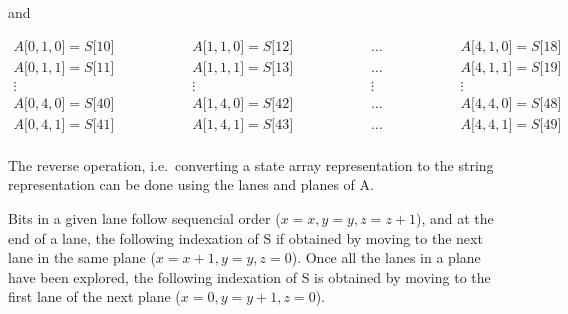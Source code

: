 and

\begin{equation}
\begin{aligned}
A \lbrack 0,1,0\rbrack = S\lbrack 10 \rbrack & \hspace{2cm} A \lbrack 1,1,0\rbrack = S\lbrack 12 \rbrack & \hspace{2cm} \ldots & \hspace{2cm} A \lbrack 4,1,0\rbrack = S\lbrack 18 \rbrack\\
A \lbrack 0,1,1\rbrack = S\lbrack 11 \rbrack & \hspace{2cm} A \lbrack 1,1,1\rbrack = S\lbrack 13 \rbrack & \hspace{2cm} \ldots & \hspace{2cm} A \lbrack 4,1,1\rbrack = S\lbrack 19 \rbrack\\
\vdots                                       & \hspace{2cm} \vdots                                       & \hspace{2cm} \vdots & \hspace{2cm} \vdots                                    \\
A \lbrack 0,4,0\rbrack = S\lbrack 40 \rbrack & \hspace{2cm} A \lbrack 1,4,0\rbrack = S\lbrack 42 \rbrack & \hspace{2cm} \ldots & \hspace{2cm} A \lbrack 4,4,0\rbrack = S\lbrack 48 \rbrack\\
A \lbrack 0,4,1\rbrack = S\lbrack 41 \rbrack & \hspace{2cm} A \lbrack 1,4,1\rbrack = S\lbrack 43 \rbrack & \hspace{2cm} \ldots & \hspace{2cm} A \lbrack 4,4,1\rbrack = S\lbrack 49 \rbrack\\
\end{aligned}
\end{equation}


The reverse operation, i.e.\ converting a state array representation to the string representation can be done using the lanes and planes of A.

Bits in a given lane follow sequencial order ($x=x, y=y, z=z+1$), and at the end of a lane, the following indexation of S if obtained by moving to the next lane in the same plane ($x=x+1, y=y, z=0$).
Once all the lanes in a plane have been explored, the following indexation of S is obtained by moving to the first lane of the next plane ($x=0, y=y+1, z=0$).

